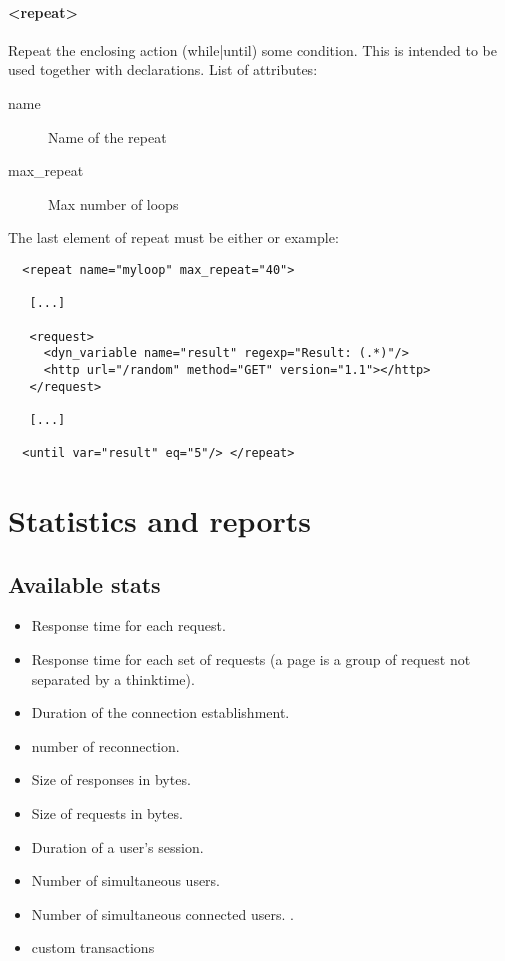 \documentclass{IDXDOC-en}
\begin{document}
\paragraph{<repeat>}
Repeat the enclosing action (while|until) some condition. This is
intended to be used together with  declarations. List of
attributes:

\begin{description}
\item[name] Name of the repeat
\item[max\_repeat] Max number of loops
\end{description}

The last element of repeat must be either  or  example:
\begin{Verbatim}
  <repeat name="myloop" max_repeat="40">

   [...]

   <request>
     <dyn_variable name="result" regexp="Result: (.*)"/>
     <http url="/random" method="GET" version="1.1"></http>
   </request>

   [...]

  <until var="result" eq="5"/> </repeat>
\end{Verbatim}

\section{Statistics and reports}
\label{sec:statistics-reports}

\subsection{Available stats}

\begin{itemize}
\item  {} Response time for each request.
\item  {} Response time for each set of requests (a page is a group
  of request not separated by a thinktime).
\item  {} Duration of the connection establishment.
\item  {} number of reconnection.
\item  {} Size of responses in bytes.
\item  {} Size of requests in bytes.
\item  {} Duration of a user's session.
\item  {} Number of simultaneous users.
\item  {} Number of simultaneous connected users. .
\item  custom transactions
\end{itemize}
\end{document}
